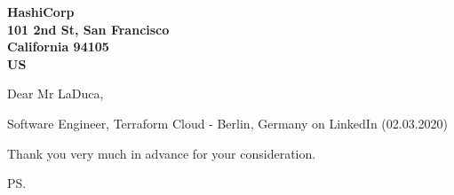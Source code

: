 \documentclass[a4paper]{cover-letter}
\begin{document}
\longindentation=0pt

\newcommand{\companyName}{HashiCorp}


\begin{letter}{\bfseries \companyName\\101 2nd St, San Francisco\\California 94105\\US}


\date{Berlin, \today}

\opening{Dear Mr LaDuca,}{Software Engineer, Terraform Cloud - Berlin, Germany on LinkedIn (02.03.2020)}



%

%


\closing{ Thank you very much in advance for your consideration.}
\vspace{20pt}
\ps

\vspace{\fill}

\end{letter}
\end{document}
